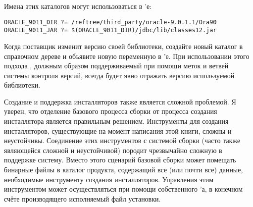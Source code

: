 Имена этих каталогов могут использоваться в \Makefile{}'е:

{\footnotesize
\begin{verbatim}
ORACLE_9011_DIR ?= /reftree/third_party/oracle-9.0.1.1/Ora90
ORACLE_9011_JAR ?= $(ORACLE_9011_DIR)/jdbc/lib/classes12.jar
\end{verbatim}
}

Когда поставщик изменит версию своей библиотеки, создайте новый
каталог в справочном дереве и объявите новую переменную в
\Makefile{}'е. При использовании этого подхода \Makefile{}, должным
образом поддерживаемый при помощи меток и ветвей системы контроля
версий, всегда будет явно отражать версию используемой библиотеки.

Создание и поддержка инсталляторов также является сложной проблемой. Я
уверен, что отделение базового процесса сборки от процесса создания
инсталлятора является правильным решением. Инструменты для создания
инсталляторов, существующие на момент написания этой книги, сложны и
неустойчивы. Соединение этих инструментов с системой сборки (часто
также являющейся сложной и неустойчивой) породит чрезвычайно сложную в
поддержке систему. Вместо этого сценарий базовой сборки может помещать
бинарные файлы в каталог продукта, содержащий все (или почти все)
данные, необходимые инструменту создания инсталляторов. Управления
этим инструментом может осуществляться при помощи собственного
\Makefile{}'а, в конечном счёте производящего исполняемый файл
установки.
